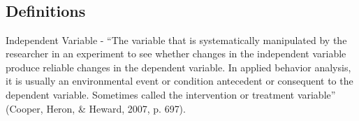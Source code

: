 %
%
%
\fourbOne{}\\
\fourhFour{}\\
\fouriFive{}\\
\fourFKFour{}\\
\fourFKNine{}\\
\fourFKThirtyThree{}\\
%
%
%
%
%
%
%
\chapter[B-03 Systematically arrange independent variables...]{\fourbThree{}}
\section{Definitions} 
Independent Variable - ``The variable that is systematically manipulated by the researcher in an experiment to see whether changes in the independent variable produce reliable changes in the dependent variable. In applied behavior analysis, it is usually an environmental event or condition antecedent or consequent to the dependent variable. Sometimes called the intervention or treatment variable'' (Cooper, Heron, \& Heward, 2007, p. 697).\\

